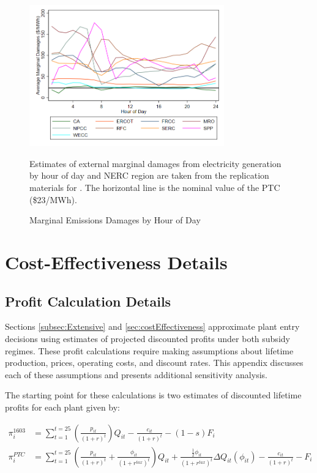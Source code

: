 \documentclass[12pt]{article}
\begin{document}
\begin{figure}[ht]
\begin{center}
\caption{Marginal Emissions Damages by Hour of Day \label{fig:md_np_hmmy}}
\includegraphics[width=0.75\textwidth]{md_np_hmmy.png}
\end{center}
\footnotesize Estimates of external marginal damages from electricity generation by hour of day and NERC region are taken from the replication materials for \citet{holland_are_2016}. The horizontal line is the nominal value of the PTC (\$23/MWh).
\end{figure}


\clearpage
\section{Cost-Effectiveness Details \label{Appendix:CostEffectiveness}}
\subsection{Profit Calculation Details \label{Appendix:Profitability-calculation-detail}}

Sections \ref{subsec:Extensive} and \ref{sec:costEffectiveness} approximate plant entry decisions using estimates of projected discounted profits under both subsidy regimes. These profit calculations require making assumptions about lifetime production, prices, operating costs, and discount rates. This appendix discusses each of these assumptions and presents additional sensitivity analysis.

The starting point for these calculations is two estimates of discounted lifetime profits for each plant given by:

\begin{align*}
\pi_i^{1603}&=\sum_{t=1}^{t=25} \left(\frac{p_{it}}{(1+r)^{t}}\right) Q_{it} - \frac{c_{it}}{(1+r)^{t}} -(1-s)F_i \\
\pi_i^{PTC}&=\sum_{t=1}^{t=25}\left(\frac{p_{it}}{(1+r)^t} + \frac{\phi_{it}}{(1+r^{tax})^t} \right) Q_{it} 
 + \frac{\frac{1}{2} \phi_{it}}{(1+r^{tax})^t} \Delta Q_{it}(\phi_{it})
 - \frac{c_{it}}{(1+r)^t} - F_i\label{eq:piPTC_app}
\end{align*}
\end{document}
